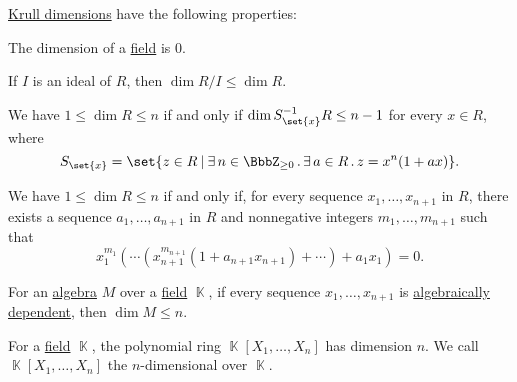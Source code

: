 \begin{proposition}\label{thm:def:krull_dimension}
  \hyperref[def:krull_dimension]{Krull dimensions} have the following properties:
  \begin{thmenum}
     The dimension of a \hyperref[def:field]{field} is \( 0 \).

     If \( I \) is an ideal of \( R \), then \( \dim R / I \leq \dim R \).

     We have \( 1 \leq \dim R \leq n \) if and only if \( \dim S_{\set{ x }}^{-1} R \leq n - 1 \) for every \( x \in R \), where
    \begin{equation*}
      S_{\set{ x }} = \set{ z \in R \given \qexists {n \in \BbbZ_{\geq 0}} \qexists {a \in R} z = x^n (1 + ax) }.
    \end{equation*}

     We have \( 1 \leq \dim R \leq n \) if and only if, for every sequence \( x_1, \ldots, x_{n+1} \) in \( R \), there exists a sequence \( a_1, \ldots, a_{n+1} \) in \( R \) and nonnegative integers \( m_1, \ldots, m_{n+1} \) such that
    \begin{equation*}
      x_1^{m_1} ( \cdots ( x_{n+1}^{m_{n+1}} ( 1 + a_{n+1} x_{n+1} ) + \cdots ) + a_1 x_1 ) = 0.
    \end{equation*}

     For an \hyperref[def:algebra_over_ring]{algebra} \( M \) over a \hyperref[def:field]{field} \( \BbbK \), if every sequence \( x_1, \ldots, x_{n+1} \) is \hyperref[def:algebraic_dependence]{algebraically dependent}, then \( \dim M \leq n \).

     For a \hyperref[def:field]{field} \( \BbbK \), the polynomial ring \( \BbbK[X_1, \ldots, X_n] \) has dimension \( n \). We call \( \BbbK[X_1, \ldots, X_n] \) the \( n \)-dimensional  over \( \BbbK \).
  \end{thmenum}
\end{proposition}
